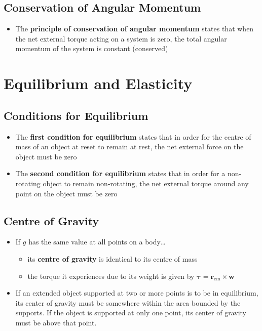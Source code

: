 \documentclass{article}
\begin{document}
\subsection{Conservation of Angular Momentum}

\begin{itemize}
    \item The \textbf{principle of conservation of angular momentum} states that when the net external torque acting on a system is zero, the total angular momentum of the system is constant (conserved)
\end{itemize}

\section{Equilibrium and Elasticity}

\subsection{Conditions for Equilibrium}

\begin{itemize}
    \item The \textbf{first condition for equilibrium} states that in order for the centre of mass of an object at reset to remain at rest, the net external force on the object must be zero

    \item The \textbf{second condition for equilibrium} states that in order for a non-rotating object to remain non-rotating, the net external torque around any point on the object must be zero
\end{itemize}

\subsection{Centre of Gravity}

\begin{itemize}
    \item If $g$ has the same value at all points on a body…

          \begin{itemize}
              \item its \textbf{centre of gravity} is identical to its centre of mass

              \item the torque it experiences due to its weight is given by $\boldsymbol \tau = \mathbf r_\textrm{cm} \times \mathbf w$
          \end{itemize}

    \item If an extended object supported at two or more points is to be in equilibrium, its center of gravity must be somewhere within the area bounded by the supports. If the object is supported at only one point, its center of gravity must be above that point.
\end{itemize}
\end{document}

